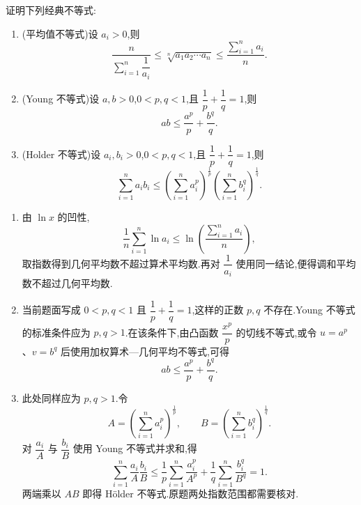 \begin{example}[\markstar]
    证明下列经典不等式:
    \begin{enumerate}
        \item (平均值不等式)设 $a_i>0$,则
              \[
                  \dfrac{n}{\displaystyle\sum\limits_{i=1}^n\dfrac{1}{a_i}}
                  \leq\sqrt[n]{a_1a_2\cdots a_n}
                  \leq\dfrac{\displaystyle\sum\limits_{i=1}^n a_i}{n}.
              \]
        \item (Young 不等式)设 $a,b>0$,$0<p,q<1$,且 $\dfrac{1}{p}+\dfrac{1}{q}=1$,则
              \[
                  ab\leq\dfrac{a^p}{p}+\dfrac{b^q}{q}.
              \]
        \item (Holder 不等式)设 $a_i,b_i>0$,$0<p,q<1$,且 $\dfrac{1}{p}+\dfrac{1}{q}=1$,则
              \[
                  \sum\limits_{i=1}^n a_i b_i
                  \leq
                  \left(\sum\limits_{i=1}^n a_i^p\right)^{\frac{1}{p}}
                  \left(\sum\limits_{i=1}^n b_i^q\right)^{\frac{1}{q}}.
              \]
    \end{enumerate}
\end{example}
\exampleblank

\begin{solution}
    \begin{enumerate}
        \item 由 $\ln x$ 的凹性,
              \[
                  \dfrac{1}{n}\sum\limits_{i=1}^{n}\ln a_i
                  \leq\ln\left(\dfrac{\displaystyle\sum\limits_{i=1}^{n}a_i}{n}\right),
              \]
              取指数得到几何平均数不超过算术平均数.再对 $\dfrac{1}{a_i}$ 使用同一结论,便得调和平均数不超过几何平均数.

        \item 当前题面写成 $0<p,q<1$ 且 $\dfrac{1}{p}+\dfrac{1}{q}=1$,这样的正数 $p,q$ 不存在.Young 不等式的标准条件应为 $p,q>1$.在该条件下,由凸函数 $\dfrac{x^p}{p}$ 的切线不等式,或令 $u=a^p$、$v=b^q$ 后使用加权算术—几何平均不等式,可得
              \[
                  ab\leq\dfrac{a^p}{p}+\dfrac{b^q}{q}.
              \]

        \item 此处同样应为 $p,q>1$.令
              \[
                  A=\left(\sum\limits_{i=1}^{n}a_i^p\right)^{\frac{1}{p}},
                  \qquad
                  B=\left(\sum\limits_{i=1}^{n}b_i^q\right)^{\frac{1}{q}}.
              \]
              对 $\dfrac{a_i}{A}$ 与 $\dfrac{b_i}{B}$ 使用 Young 不等式并求和,得
              \[
                  \sum\limits_{i=1}^{n}\dfrac{a_i}{A}\dfrac{b_i}{B}
                  \leq\dfrac{1}{p}\sum\limits_{i=1}^{n}\dfrac{a_i^p}{A^p}
                  +\dfrac{1}{q}\sum\limits_{i=1}^{n}\dfrac{b_i^q}{B^q}
                  =1.
              \]
              两端乘以 $AB$ 即得 Hölder 不等式.原题两处指数范围都需要核对.
    \end{enumerate}
\end{solution}
